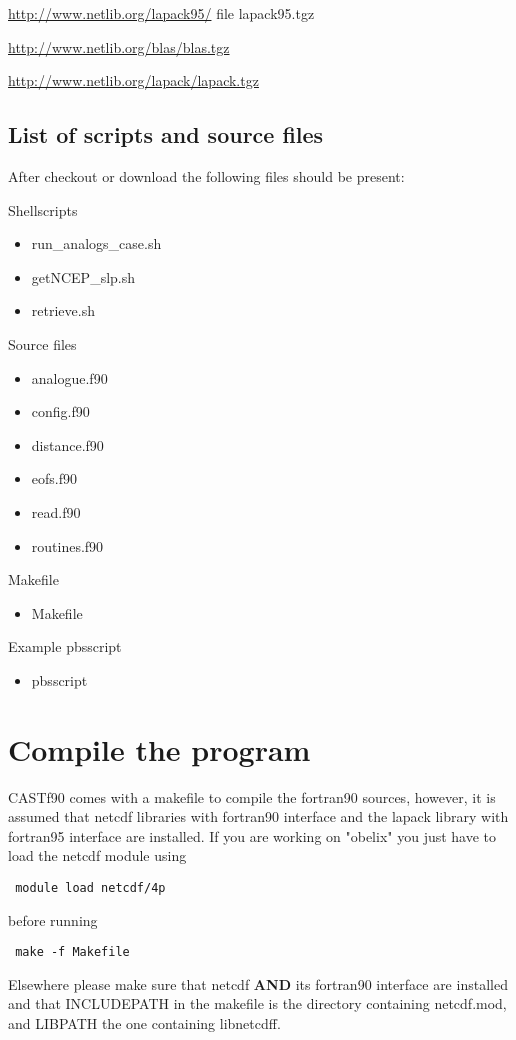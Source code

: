 \documentclass[11p,a4paper]{article}
\begin{document}
\href{http://www.netlib.org/lapack95/}{http://www.netlib.org/lapack95/} file lapack95.tgz

\href{http://www.netlib.org/blas/blas.tgz}{http://www.netlib.org/blas/blas.tgz} 

\href{http://www.netlib.org/lapack/lapack.tgz}{http://www.netlib.org/lapack/lapack.tgz}

\subsection{List of scripts and source files}
\label{sec:listoffiles}
After checkout or download the following files should be present:

Shellscripts
\begin{itemize}
 \item run\_analogs\_case.sh
 \item getNCEP\_slp.sh 
 \item retrieve.sh
\end{itemize}
Source files
\begin{itemize}
 \item analogue.f90  
 \item config.f90  
 \item distance.f90  
 \item eofs.f90  
 \item read.f90  
 \item routines.f90 
\end{itemize}
Makefile
\begin{itemize}
 \item Makefile
\end{itemize}
Example pbsscript
\begin{itemize}
 \item pbsscript
\end{itemize}

\section{Compile the program}
\label{sec:compil}
CASTf90 comes with a makefile to compile the fortran90 sources, however, it is assumed that netcdf libraries with fortran90 interface and the lapack library with fortran95 interface are installed.
If you are working on "obelix" you just have to load the netcdf module using
\begin{verbatim}
 module load netcdf/4p
\end{verbatim}
before running 
\begin{verbatim}
 make -f Makefile
\end{verbatim}
Elsewhere please make sure that netcdf \textbf{AND} its fortran90 interface are installed and that INCLUDEPATH in the makefile is the directory containing netcdf.mod, and LIBPATH the one containing libnetcdff. 
\end{document}
